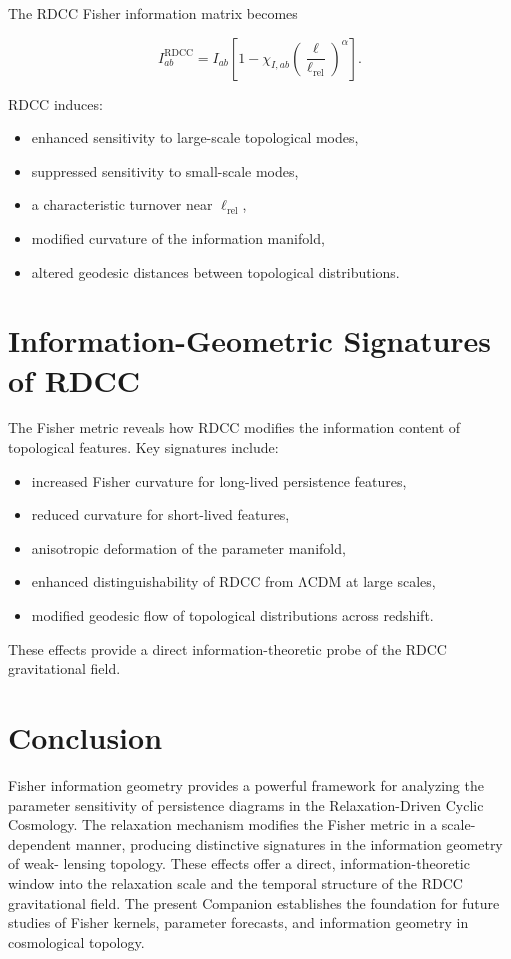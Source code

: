 \documentclass[11pt,a4paper]{article}
\begin{document}
The RDCC Fisher information matrix becomes

\begin{equation}
    I^{\mathrm{RDCC}}_{ab}
    = I_{ab}
      \left[
        1 - \chi_{I,ab}
        \left(\frac{\ell}{\ell_{\mathrm{rel}}}\right)^{\alpha}
      \right].
\end{equation}

RDCC induces:

\begin{itemize}
    \item enhanced sensitivity to large-scale topological modes,
    \item suppressed sensitivity to small-scale modes,
    \item a characteristic turnover near $\ell_{\mathrm{rel}}$,
    \item modified curvature of the information manifold,
    \item altered geodesic distances between topological distributions.
\end{itemize}
\section{Information-Geometric Signatures of RDCC}

The Fisher metric reveals how RDCC modifies the information content of topological 
features. Key signatures include:

\begin{itemize}
    \item increased Fisher curvature for long-lived persistence features,
    \item reduced curvature for short-lived features,
    \item anisotropic deformation of the parameter manifold,
    \item enhanced distinguishability of RDCC from ΛCDM at large scales,
    \item modified geodesic flow of topological distributions across redshift.
\end{itemize}

These effects provide a direct information-theoretic probe of the RDCC 
gravitational field.
\section{Conclusion}

Fisher information geometry provides a powerful framework for analyzing the 
parameter sensitivity of persistence diagrams in the Relaxation-Driven Cyclic 
Cosmology. The relaxation mechanism modifies the Fisher metric in a scale-dependent 
manner, producing distinctive signatures in the information geometry of weak-
lensing topology. These effects offer a direct, information-theoretic window into 
the relaxation scale and the temporal structure of the RDCC gravitational field. 
The present Companion establishes the foundation for future studies of Fisher 
kernels, parameter forecasts, and information geometry in cosmological topology.


\nocite{*}

\end{document}
